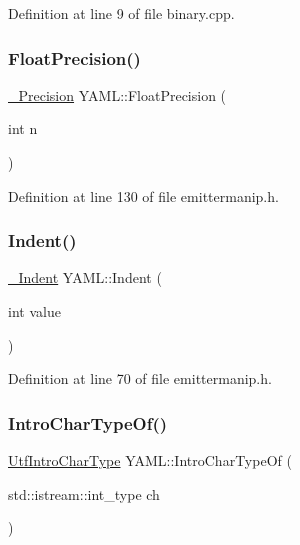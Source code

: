 Definition at line 9 of file binary.\+cpp.

\mbox{\label{namespace_y_a_m_l_ad8d898600ad3706488afdea02142a098}} 
\subsubsection{\texorpdfstring{FloatPrecision()}{FloatPrecision()}}
{\footnotesize\ttfamily \mbox{\hyperlink{struct_y_a_m_l_1_1___precision}{\+\_\+\+Precision}} Y\+A\+M\+L\+::\+Float\+Precision (\begin{DoxyParamCaption}\item[{int}]{n }\end{DoxyParamCaption})\hspace{0.3cm}{\ttfamily [inline]}}



Definition at line 130 of file emittermanip.\+h.

\mbox{\label{namespace_y_a_m_l_aac525b330f69de8ded003d068b2f6f3a}} 
\subsubsection{\texorpdfstring{Indent()}{Indent()}}
{\footnotesize\ttfamily \mbox{\hyperlink{struct_y_a_m_l_1_1___indent}{\+\_\+\+Indent}} Y\+A\+M\+L\+::\+Indent (\begin{DoxyParamCaption}\item[{int}]{value }\end{DoxyParamCaption})\hspace{0.3cm}{\ttfamily [inline]}}



Definition at line 70 of file emittermanip.\+h.

\mbox{\label{namespace_y_a_m_l_a505a93ae230ef18b9a1b2b7acdb56c87}} 
\subsubsection{\texorpdfstring{IntroCharTypeOf()}{IntroCharTypeOf()}}
{\footnotesize\ttfamily \mbox{\hyperlink{namespace_y_a_m_l_ae1a7736039063f2f0147bcc1633eeadb}{Utf\+Intro\+Char\+Type}} Y\+A\+M\+L\+::\+Intro\+Char\+Type\+Of (\begin{DoxyParamCaption}\item[{std\+::istream\+::int\+\_\+type}]{ch }\end{DoxyParamCaption})\hspace{0.3cm}{\ttfamily [inline]}}



